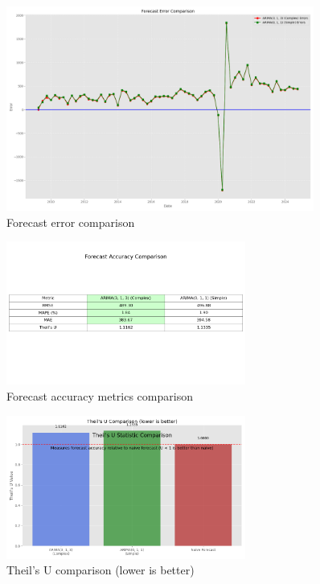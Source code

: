 \documentclass[11pt,a4paper]{article}
\begin{document}
\begin{figure}[H]
    \centering
    \includegraphics[width=0.9\textwidth]{plots/arima/gdp/figure9_forecast_error_comparison.png}
    \caption{Forecast error comparison}
    \label{fig:forecast_error}
\end{figure}

\begin{figure}[H]
    \centering
    \includegraphics[width=0.7\textwidth]{plots/arima/gdp/figure10_forecast_accuracy.png}
    \caption{Forecast accuracy metrics comparison}
    \label{fig:forecast_accuracy}
\end{figure}

\begin{figure}[H]
    \centering
    \includegraphics[width=0.7\textwidth]{plots/arima/gdp/figure10_theil_u.png}
    \caption{Theil's U comparison (lower is better)}
    \label{fig:theil_u}
\end{figure}
\end{document}
